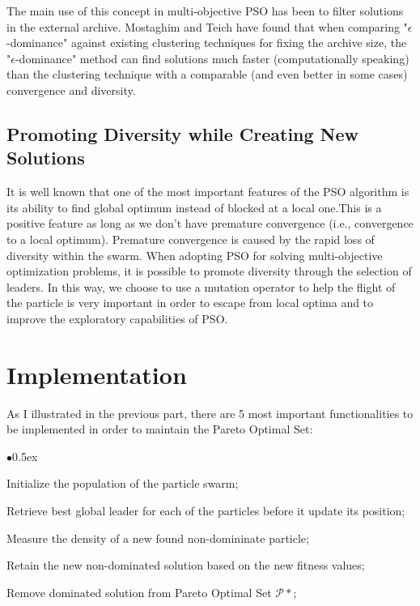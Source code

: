 \documentclass[11pt, runningheads,a4paper]{llncs}
\begin{document}
The main use of this concept in multi-objective PSO has been to filter solutions in the external archive. Mostaghim and Teich \cite{epsilon2003} have found that when comparing "$\epsilon$-dominance" against existing clustering techniques for fixing the archive size, the "$\epsilon$-dominance" method can find solutions much faster (computationally speaking) than the clustering technique with a comparable (and even better in some cases) convergence and diversity.

\subsection{Promoting Diversity while Creating New Solutions}
It is well known that one of the most important features of the PSO algorithm is its ability to find global optimum instead of blocked at a local one.This is a positive feature as long as we don't have premature convergence (i.e., convergence to a local optimum). Premature convergence is caused by the rapid loss of diversity within the swarm. When adopting PSO for solving multi-objective optimization problems, it is possible to promote diversity through the selection of leaders. 
In this way, we choose to use a mutation operator to help the flight of the particle is very important in order to escape from local optima and to improve the exploratory capabilities of PSO. 


\section{Implementation}
\label{Implementation}
As I illustrated in the previous part, there are 5 most important  functionalities to be implemented in order to maintain the Pareto Optimal Set:

\begin{list}{$\bullet$}{\itemsep 0.5ex}
\item Initialize the population of the particle swarm; 
\item Retrieve best global leader for each of the particles before it update its position;
\item Measure the density of a new found non-domininate particle;
\item Retain the new non-dominated solution based on the new fitness values;
\item Remove dominated solution from Pareto Optimal Set $\mathcal{P}*$;
\end{list}
\end{document}
